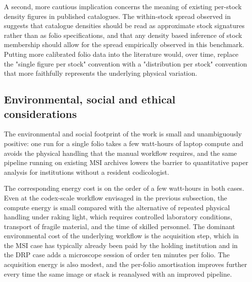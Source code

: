 A second, more cautious implication concerns the meaning of
existing per-stock density figures in published catalogues. The
within-stock spread observed in
 suggests that catalogue
densities should be read as approximate stock signatures rather
than as folio specifications, and that any density based
inference of stock membership should allow for the spread
empirically observed in this benchmark. Putting more calibrated
folio data into the literature would, over time, replace the
"single figure per stock" convention with a "distribution per stock"
convention that more faithfully represents the underlying physical
variation.

\subsection{Environmental, social and ethical considerations}
\label{sec:discussion:ethics}

The environmental and social footprint of the work is small and
unambiguously positive: one run for a single folio takes a few watt-hours of
laptop compute and avoids the physical handling that the manual
workflow requires, and the same pipeline running on existing MSI
archives lowers the barrier to quantitative paper analysis for
institutions without a resident codicologist.

\iffalse
The corresponding energy
cost is on the order of a few watt-hours in both cases. Even at
the codex-scale workflow envisaged in the previous subsection,
the compute energy is small compared with the alternative of
repeated physical handling under raking light, which requires
controlled laboratory conditions, transport of fragile material,
and the time of skilled personnel. The dominant environmental
cost of the underlying workflow is the acquisition step, which
in the MSI case has typically already been paid by the holding
institution and in the DRP case adds a microscope session of
order ten minutes per folio. The acquisition energy is also
modest, and the per-folio amortisation improves further every
time the same image or stack is reanalysed with an improved
pipeline.

